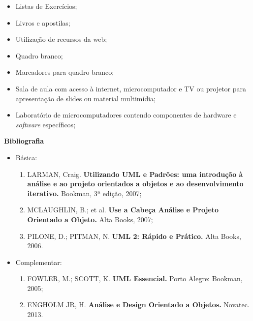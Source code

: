 \begin{itemize} 
  	\item Listas de Exercícios;
  	  \item Livros e apostilas;
  	  \item Utilização de recursos da web;
  	  \item Quadro branco;
  	  \item Marcadores para quadro branco;
  	  \item Sala de aula com acesso à internet, microcomputador e TV ou projetor para apresentação de slides ou material multimídia;
  	  \item Laboratório de microcomputadores contendo componentes de hardware e \textit{software} específicos;
\end{itemize}



\begin{snugshade}\begin{center}\textbf{
    Bibliografia
}\end{center}\end{snugshade}

\begin{itemize} 
  \item Básica:
	\begin{enumerate}
  	\item LARMAN, Craig. \textbf{Utilizando UML e Padrões: uma introdução à análise e ao projeto orientados a objetos e ao desenvolvimento iterativo.} Bookman,  3ª edição, 2007;
	\item MCLAUGHLIN, B.; et al. \textbf{Use a Cabeça Análise e Projeto Orientado a Objeto.} Alta Books, 2007;
	\item PILONE, D.; PITMAN, N. \textbf{UML 2: Rápido e Prático.} Alta Books, 2006.    	\end{enumerate}
  \item Complementar:
	\begin{enumerate} 
  	\item FOWLER, M.; SCOTT, K. \textbf{UML Essencial.} Porto Alegre: Bookman, 2005;
	\item ENGHOLM JR, H. \textbf{Análise e Design Orientado a Objetos.} Novatec. 2013.
	\end{enumerate}
\end{itemize}

